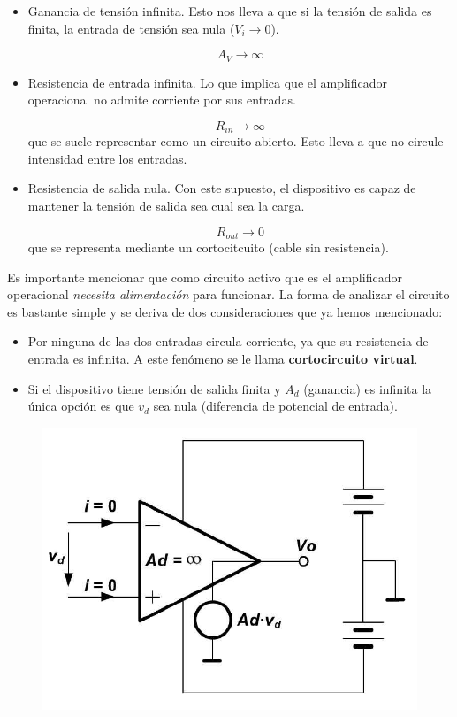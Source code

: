 \documentclass[11pt]{article} %
\begin{document}
\begin{itemize}
\item Ganancia de tensión infinita. Esto nos lleva a que si la tensión de salida es finita, la entrada de tensión sea nula ($V_i \rightarrow 0$).

$$ A_V \rightarrow \infty $$

\item Resistencia de entrada infinita. Lo que implica que el amplificador operacional no admite corriente por sus entradas.

$$ R_{in} \rightarrow \infty $$
que se suele representar como un circuito abierto. Esto lleva a que no circule intensidad entre los entradas.

\item Resistencia de salida nula. Con este supuesto, el dispositivo es capaz de mantener la tensión de salida sea cual sea la carga.

$$ R_{out} \rightarrow 0 $$
que se representa mediante un cortocitcuito (cable sin resistencia).


\end{itemize}

Es importante mencionar que como circuito activo que es el amplificador operacional \textit{necesita alimentación} para funcionar. La forma de analizar el circuito es bastante simple y se deriva de dos consideraciones que ya hemos mencionado:

\begin{itemize}
\item Por ninguna de las dos entradas circula corriente, ya que su resistencia de entrada es infinita. A este fenómeno se le llama \textbf{cortocircuito virtual}.
\item Si el dispositivo tiene tensión de salida finita y $A_d$ (ganancia) es infinita la única opción es que $v_d$ sea nula (diferencia de potencial de entrada).
\end{itemize}

\begin{figure}[h!] \centering
\includegraphics[scale=0.5]{1.1.Amplificador_ideal.png}
\end{figure}
\end{document}
